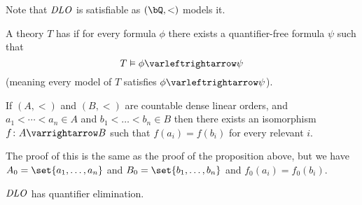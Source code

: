 \documentclass[10pt]{article}
\let\to=\varrightarrow
\let\oto=\varleftrightarrow
\begin{document}
Note that $\mathit{DLO}$ is satisfiable as $(\bQ,<)$ models it.

\begin{defn*}

    A theory $T$ has  if for every formula $\phi$ there exists a quantifier-free formula $\psi$ such that
    \[ T\vDash\phi\oto\psi \]
    (meaning every model of $T$ satisfies $\phi\oto\psi$).

\end{defn*}

\begin{lemm*}

    If $(A,<)$ and $(B,<)$ are countable dense linear orders, and $a_1<\cdots<a_n\in A$ and $b_1<\dots<b_n\in B$ then there exists an isomorphism $f\colon A\to B$ such that $f(a_i)=f(b_i)$ for every relevant
    $i$.

\end{lemm*}

The proof of this is the same as the proof of the proposition above, but we have $A_0=\set{a_1,\dots,a_n}$ and $B_0=\set{b_1,\dots,b_n}$ and $f_0(a_i)=f_0(b_i)$.

\begin{thrm*}

    $\mathit{DLO}$ has quantifier elimination.

\end{thrm*}
\end{document}

